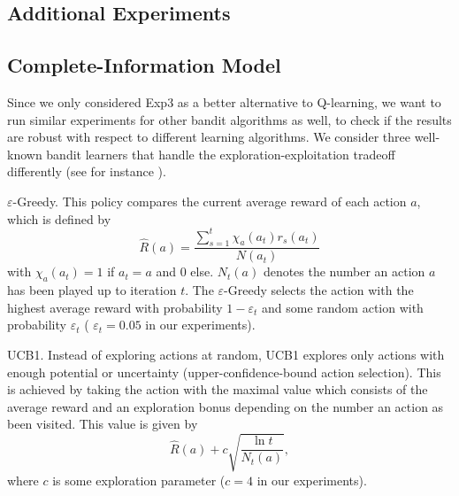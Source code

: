 \documentclass{article}
\begin{document}
	
\newpage
\begin{appendix}
\section{Additional Experiments}
\subsection{Complete-Information Model} \label{app:bandit}
Since we only considered Exp3 as a better alternative to Q-learning, we want to run similar experiments for other bandit algorithms as well, to check if the results are robust with respect to different learning algorithms. 
We consider three well-known bandit learners that handle the exploration-exploitation tradeoff differently (see for instance \cite{sutton2018ReinforcementLearningIntroduction, lattimore2020bandit}).
\begin{description}
	\item $\varepsilon$-Greedy. This policy compares the current average reward of each action $a$, which is defined by
	\begin{equation}
		\hat R(a) = \dfrac{\sum_{s=1}^t \chi_a(a_t) r_s(a_t) }{N(a_t)}
	\end{equation}
	with $\chi_a(a_t) = 1 $ if $a_t = a$ and $0$ else. 
	$N_t(a)$ denotes the number an action $a$ has been played up to iteration $t$.
	The $\varepsilon$-Greedy selects the action with the highest average reward with probability $1-\varepsilon_t$ and some random action with probability $\varepsilon_t$ ( $\varepsilon_t = 0.05$ in our experiments).
	
	\item UCB1. Instead of exploring actions at random, UCB1 explores only actions with enough potential or uncertainty (upper-confidence-bound action selection). This is achieved by taking the action with the maximal value which consists of the average reward and an exploration bonus depending on the number an action as been visited. This value is given by
	\begin{equation}
		\hat R(a) + c \sqrt{\dfrac{\ln t}{N_t(a)}},
	\end{equation}
	where $c$ is some exploration parameter ($c=4$ in our experiments).
	

\end{description}
\end{appendix}
\end{document}
